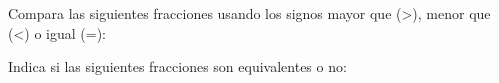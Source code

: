 \documentclass[12pt,addpoints]{evalua}
\begin{document}
\begin{questions}
    \question[8] Compara las siguientes fracciones usando los signos mayor que (>), menor que (<) o igual (=):
  
    \begin{multicols}{3}
    \end{multicols}

    \question[8] Indica si las siguientes fracciones son equivalentes o no:
    
    \begin{multicols}{2}
\end{multicols}
\end{questions}
\end{document}
